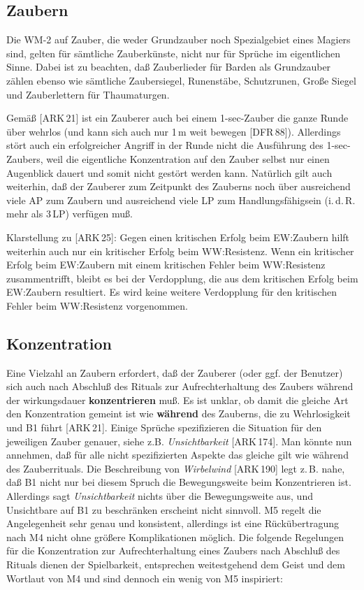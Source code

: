 \documentclass[10pt,a4paper,germanpar]{article}
\begin{document}
\subsection{Zaubern}

Die WM-2 auf Zauber, die weder Grundzauber noch Spezialgebiet eines Magiers
sind, gelten für sämtliche Zauberkünste, nicht nur für Sprüche im eigentlichen
Sinne. Dabei ist zu beachten, daß Zauberlieder für Barden als Grundzauber
zählen ebenso wie sämtliche Zaubersiegel, Runenstäbe, Schutzrunen, Große
Siegel und Zauberlettern für Thaumaturgen.

Gemäß [ARK\,21] ist ein Zauberer auch bei einem 1-sec-Zauber die ganze Runde
über wehrlos (und kann sich auch nur 1\,m weit bewegen [DFR\,88]). Allerdings
stört auch ein erfolgreicher Angriff in der Runde nicht die Ausführung des
1-sec-Zaubers, weil die eigentliche Konzentration auf den Zauber selbst nur
einen Augenblick dauert und somit nicht gestört werden kann. Natürlich gilt
auch weiterhin, daß der Zauberer zum Zeitpunkt des Zauberns noch über
ausreichend viele AP zum Zaubern und ausreichend viele LP zum
Handlungsfähigsein (i.\,d.\,R. mehr als 3\,LP) verfügen muß.

Klarstellung zu [ARK\,25]: Gegen einen kritischen Erfolg beim EW:Zaubern
hilft weiterhin auch nur ein kritischer Erfolg beim WW:Resistenz. Wenn
ein kritischer Erfolg beim EW:Zaubern mit einem kritischen Fehler beim
WW:Resistenz zusammentrifft, bleibt es bei der Verdopplung, die aus
dem kritischen Erfolg beim EW:Zaubern resultiert. Es wird keine
weitere Verdopplung für den kritischen Fehler beim WW:Resistenz
vorgenommen.

\subsection{Konzentration}

Eine Vielzahl an Zaubern erfordert, daß der Zauberer (oder ggf. der
Benutzer) sich auch nach Abschluß des Rituals zur Aufrechterhaltung
des Zaubers während der wirkungsdauer \textbf{konzentrieren} muß. Es
ist unklar, ob damit die gleiche Art den Konzentration gemeint ist wie
\textbf{während} des Zauberns, die zu Wehrlosigkeit und B1 führt
[ARK\,21]. Einige Sprüche spezifizieren die Situation für den
jeweiligen Zauber genauer, siehe z.B. \emph{Unsichtbarkeit}
[ARK\,174]. Man könnte nun annehmen, daß für alle nicht spezifizierten
Aspekte das gleiche gilt wie während des Zauberrituals. Die
Beschreibung von \emph{Wirbelwind} [ARK\,190] legt z.\,B. nahe, daß B1
nicht nur bei diesem Spruch die Bewegungsweite beim Konzentrieren
ist. Allerdings sagt \emph{Unsichtbarkeit} nichts über die
Bewegungsweite aus, und Unsichtbare auf B1 zu beschränken erscheint
nicht sinnvoll. M5 regelt die Angelegenheit sehr genau und konsistent,
allerdings ist eine Rückübertragung nach M4 nicht ohne größere
Komplikationen möglich. Die folgende Regelungen für die Konzentration
zur Aufrechterhaltung eines Zaubers nach Abschluß des Rituals dienen
der Spielbarkeit, entsprechen weitestgehend dem Geist und dem Wortlaut
von M4 und sind dennoch ein wenig von M5 inspiriert:
\end{document}
